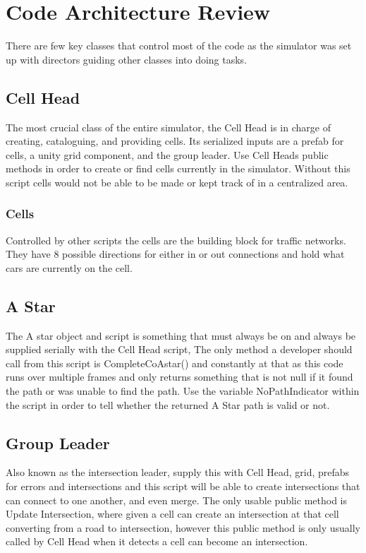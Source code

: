 \documentclass[10pt,twocolumn]{article}
\begin{document}
\section{Code Architecture Review}
There are few key classes that control most of the code as the simulator was set up with directors guiding other classes into doing tasks. 
\subsection{Cell Head}
The most crucial class of the entire simulator, the Cell Head is in charge of creating, cataloguing, and providing cells. Its serialized inputs are a prefab for cells, a unity grid component, and the group leader. Use Cell Heads public methods in order to create or find cells currently in the simulator. Without this script cells would not be able to be made or kept track of in a centralized area.
\subsubsection{Cells}
Controlled by other scripts the cells are the building block for traffic networks. They have 8 possible directions for either in or out connections and hold what cars are currently on the cell.
\subsection{A Star}
The A star object and script is something that must always be on and always be supplied serially with the Cell Head script, The only method a developer should call from this script is CompleteCoAstar() and constantly at that as this code runs over multiple frames and only returns something that is not null if it found the path or was unable to find the path. Use the variable NoPathIndicator within the script in order to tell whether the returned A Star path is valid or not.
\subsection{Group Leader}
Also known as the intersection leader, supply this with Cell Head, grid, prefabs for errors and intersections and this script will be able to create intersections that can connect to one another, and even merge. The only usable public method is Update Intersection, where given a cell can create an intersection at that cell converting from a road to intersection, however this public method is only usually called by Cell Head when it detects a cell can become an intersection.
\end{document}
